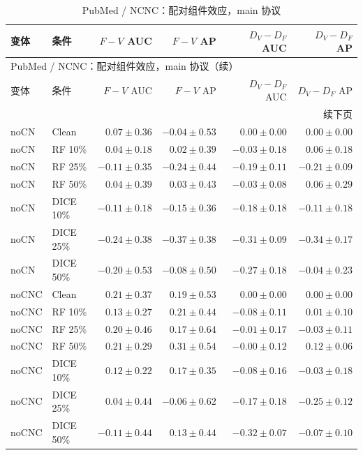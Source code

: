 {\footnotesize
\setlength{\tabcolsep}{3.2pt}
\renewcommand{\arraystretch}{1.10}
\begin{longtable}{llrrrr}
\caption{PubMed / NCNC：配对组件效应，main 协议}\\
\toprule
变体 & 条件 & $F-V$ AUC & $F-V$ AP & $D_V-D_F$ AUC & $D_V-D_F$ AP \\
\midrule
\endfirsthead
\multicolumn{6}{l}{PubMed / NCNC：配对组件效应，main 协议（续）}\\
\toprule
变体 & 条件 & $F-V$ AUC & $F-V$ AP & $D_V-D_F$ AUC & $D_V-D_F$ AP \\
\midrule
\endhead
\midrule\multicolumn{6}{r}{续下页}\\
\endfoot
\bottomrule
\endlastfoot
noCN & Clean & $0.07\pm0.36$ & $-0.04\pm0.53$ & $0.00\pm0.00$ & $0.00\pm0.00$ \\
noCN & RF 10\% & $0.04\pm0.18$ & $0.02\pm0.39$ & $-0.03\pm0.18$ & $0.06\pm0.18$ \\
noCN & RF 25\% & $-0.11\pm0.35$ & $-0.24\pm0.44$ & $-0.19\pm0.11$ & $-0.21\pm0.09$ \\
noCN & RF 50\% & $0.04\pm0.39$ & $0.03\pm0.43$ & $-0.03\pm0.08$ & $0.06\pm0.29$ \\
noCN & DICE 10\% & $-0.11\pm0.18$ & $-0.15\pm0.36$ & $-0.18\pm0.18$ & $-0.11\pm0.18$ \\
noCN & DICE 25\% & $-0.24\pm0.38$ & $-0.37\pm0.38$ & $-0.31\pm0.09$ & $-0.34\pm0.17$ \\
noCN & DICE 50\% & $-0.20\pm0.53$ & $-0.08\pm0.50$ & $-0.27\pm0.18$ & $-0.04\pm0.23$ \\
noCNC & Clean & $0.21\pm0.37$ & $0.19\pm0.53$ & $0.00\pm0.00$ & $0.00\pm0.00$ \\
noCNC & RF 10\% & $0.13\pm0.27$ & $0.21\pm0.44$ & $-0.08\pm0.11$ & $0.01\pm0.10$ \\
noCNC & RF 25\% & $0.20\pm0.46$ & $0.17\pm0.64$ & $-0.01\pm0.17$ & $-0.03\pm0.11$ \\
noCNC & RF 50\% & $0.21\pm0.29$ & $0.31\pm0.54$ & $-0.00\pm0.12$ & $0.12\pm0.06$ \\
noCNC & DICE 10\% & $0.12\pm0.22$ & $0.17\pm0.35$ & $-0.08\pm0.16$ & $-0.03\pm0.18$ \\
noCNC & DICE 25\% & $0.04\pm0.44$ & $-0.06\pm0.62$ & $-0.17\pm0.18$ & $-0.25\pm0.12$ \\
noCNC & DICE 50\% & $-0.11\pm0.44$ & $0.13\pm0.44$ & $-0.32\pm0.07$ & $-0.07\pm0.10$ \\
\end{longtable}
}

